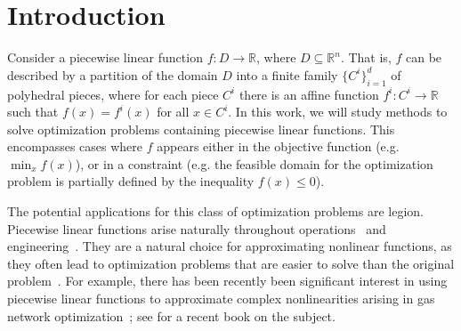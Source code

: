 \documentclass[opre,nonblindrev]{informs3} %
\newcommand{\bbR}{\mathbb{R}}
\begin{document}
\section{Introduction}
Consider a piecewise linear function $f: D \to \bbR$, where $D \subseteq \bbR^n$. That is, $f$ can be described by a partition of the domain $D$ into a finite family $\{C^i\}_{i=1}^d$ of polyhedral pieces, where for each piece $C^i$ there is an affine function $f^i : C^i \to \bbR$ such that $f(x) = f^i(x)$ for all $x \in C^i$. In this work, we will study methods to solve optimization problems containing piecewise linear functions. This encompasses cases where $f$ appears either in the objective function (e.g. $\min_{x} f(x)$), or in a constraint (e.g. the feasible domain for the optimization problem is partially defined by the inequality $f(x) \leq 0$).

The potential applications for this class of optimization problems are legion. Piecewise linear functions arise naturally throughout operations~\citep{Croxton:2003,Croxton:2007,Liu:2015a} and engineering~\citep{Fugenschuh:2014,Graf:1990,Silva:2012}. They are a natural choice for approximating nonlinear functions, as they often lead to optimization problems that are easier to solve than the original problem~\citep{Bergamini:2005,Bergamini:2008,Castro:2013,Geisler:2012,Kolodziej:2013,Misener:2011,Misener:2012}. For example, there has been recently been significant interest in using piecewise linear functions to approximate complex nonlinearities arising in gas network optimization~\citep{Codas:2012,Codas:2012a,Martin:2006,Mahlke:2010,Misener:2009,Silva:2014}; see \cite{Koch:2015} for a recent book on the subject.
\end{document}
